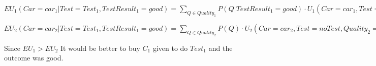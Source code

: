 \documentclass{homework}
\begin{document}
\begin{enumerate}
	$EU_1(Car=car_1|Test=Test_1, TestResult_1=good)=\sum_{Q\in Quality_1} P(Q|TestResult_1=good)\cdot U_1(Car=car_1, Test=Test_1,Quality_1=Q)=0.85\cdot (2000-1500-50-0) + (1-0.85)\cdot (2000-1500-50-700)=345$

	$EU_2(Car=car_2|Test=Test_1, TestResult_1=good)=\sum_{Q\in Quality_2} P(Q)\cdot U_2(Car=car_2, Test=noTest,Quality_2=Q)=0.65\cdot (1400-1150-0-0) + (1-0.65)\cdot (1400-1150-0-150)=197.5$

	Since $EU_1 > EU_2$ It would be better to buy $C_1$ given to do $Test_1$ and the outcome was good.
\end{enumerate}
\end{document}
